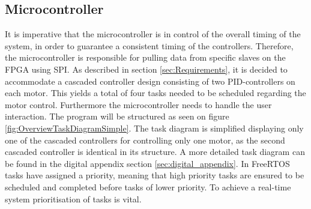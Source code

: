 \documentclass[../../main.tex]{subfiles}
\begin{document}
\subsection{Microcontroller} \label{subsec:SystemImplementationMicroController}
It is imperative that the microcontroller is in control of the overall timing of the system, in order to guarantee a consistent timing of the controllers. Therefore, the microcontroller is responsible for pulling data from specific slaves on the FPGA using SPI. As described in section \ref{sec:Requirements}, it is decided to accommodate a cascaded controller design consisting of two PID-controllers on each motor. This yields a total of four tasks needed to be scheduled regarding the motor control. Furthermore the microcontroller needs to handle the user interaction. The program will be structured as seen on figure \ref{fig:OverviewTaskDiagramSimple}. The task diagram is simplified displaying only one of the cascaded controllers for controlling only one motor, as the second cascaded controller is identical in its structure. A more detailed task diagram can be found in the digital appendix section \ref{sec:digital_appendix}. In FreeRTOS tasks have assigned a priority, meaning that high priority tasks are ensured to be scheduled and completed before tasks of lower priority. To achieve a real-time system prioritisation of tasks is vital.






\end{document}
